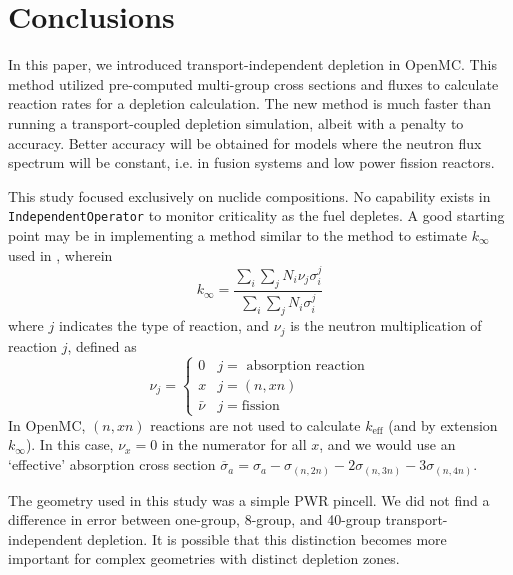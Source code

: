 \section{Conclusions}\label{sec:conclusion}
    In this paper, we introduced transport-independent depletion in OpenMC. This
    method utilized pre-computed multi-group cross sections and fluxes to
    calculate reaction rates for a depletion calculation. The new method is much
    faster than running a transport-coupled depletion simulation, albeit with a
    penalty to accuracy. Better accuracy will be obtained for models where the
    neutron flux spectrum will be constant, i.e. in fusion systems and low power
    fission reactors.
         
    This study focused exclusively on nuclide compositions. No capability exists
    in \verb.IndependentOperator. to monitor criticality as the fuel depletes. A
    good starting point may be in implementing a method similar to the method to
    estimate $k_{\infty}$ used in \cite{LOVECKY2014333}, wherein
    \begin{equation}
        k_{\infty} = \frac{\sum_{i} \sum_{j} N_{i} \nu_{j}
        \sigma_{i}^{j}}{\sum_{i}\sum_{j} N_{i} \sigma_{i}^{j}}  
    \end{equation}
    where $j$ indicates the type of reaction, and $\nu_{j}$ is the neutron
    multiplication of reaction $j$, defined as
    \begin{equation}
        \nu_j = \begin{cases}
            0 & j=\text{ absorption reaction}\\
            x & j=(n,xn)\\
            \bar{\nu} & j=\text{fission}
        \end{cases}
    \end{equation}
    In OpenMC, $(n,xn)$ reactions are not used to calculate $k_\text{eff}$ (and
    by extension $k_{\infty}$). In this case, $\nu_{x} = 0$ in the numerator for
    all $x$, and we would use an `effective' absorption cross section
    $\overline{\sigma}_{a} = \sigma_{a} - \sigma_{(n,2n)} - 2\sigma_{(n,3n)} -
    3\sigma_{(n,4n)}$. 

    The geometry used in this study was a simple PWR pincell. We did not find
    a difference in error between one-group, 8-group, and 40-group
    transport-independent depletion. It is possible that this distinction
    becomes more important for complex geometries with distinct depletion zones.

